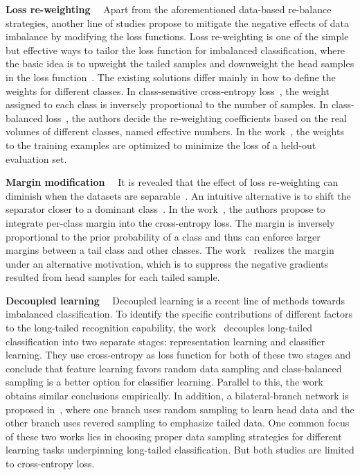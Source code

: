 \documentclass[final]{cvpr}
\begin{document}
\par{\textbf{Loss re-weighting}}~~
Apart from the aforementioned data-based re-balance strategies, another line of studies propose to mitigate the negative effects of data imbalance by modifying the loss functions. Loss re-weighting is one of the simple but effective ways to tailor the loss function for imbalanced classification, where the basic idea is to upweight the tailed samples and downweight the head samples in the loss function~\cite{cost-sensitive}. The existing solutions differ mainly in how to define the weights for different classes. In class-sensitive cross-entropy loss~\cite{Japkowicz02theclass}, the weight assigned to each class is inversely proportional to the number of samples. In class-balanced loss~\cite{effnumber}, the authors decide the re-weighting coefficients based on the real volumes of different classes, named effective numbers. In the work~\cite{ren18l2rw}, the weights to the training examples are optimized to minimize the loss of a held-out evaluation set. 


\par{\textbf{Margin modification}}~~
It is revealed that the effect of loss re-weighting can diminish when the datasets are separable~\cite{importance_effect}. An intuitive alternative is to shift the separator closer to a dominant class~\cite{logit_adjustment}. In the work~\cite{cao2019learning}, the authors propose to integrate per-class margin into the cross-entropy loss. The margin is inversely proportional to the prior probability of a class and thus can enforce larger margins between a tail class and other classes. The work~\cite{equalloss} realizes the margin under an alternative motivation, which is to suppress the negative gradients resulted from head samples for each tailed sample. 


\par{\textbf{Decoupled learning}}~~
Decoupled learning is a recent line of methods towards imbalanced classification. To identify the specific contributions of different factors to the long-tailed recognition capability, the work~\cite{Decoupling} decouples long-tailed classification into two separate stages: representation learning and classifier learning. They use cross-entropy as loss function for both of these two stages and conclude that feature learning favors random data sampling and class-balanced sampling is a better option for classifier learning. Parallel to this, the work~\cite{BBN} obtains similar conclusions empirically. In addition, a bilateral-branch network is proposed in~\cite{BBN}, where one branch uses random sampling to learn head data and the other branch uses revered sampling to emphasize tailed data. 
One common focus of these two works lies in choosing proper data sampling strategies for different learning tasks underpinning long-tailed classification. But both studies are limited to cross-entropy loss. 
\end{document}
